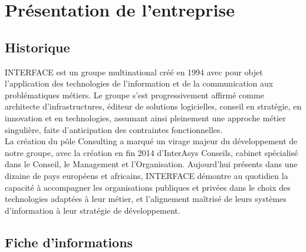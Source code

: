 \chapter{Présentation de l’entreprise}

\section{Historique}

INTERFACE est un groupe multinational créé en 1994 avec pour objet l’application des technologies de l’information et de la communication aux problématiques métiers. Le groupe s’est progressivement affirmé comme architecte d’infrastructures, éditeur de solutions logicielles, conseil en stratégie, en innovation et en technologies, assumant ainsi pleinement une approche métier singulière, faite d’anticipation des contraintes fonctionnelles. \\
La création du pôle Consulting a marqué un virage majeur du développement de notre groupe, avec la création en fin 2014 d’InterAsys Conseils, cabinet spécialisé dans le Conseil, le Management et l’Organisation. Aujourd’hui présents dans une dizaine de pays européens et africains, INTERFACE démontre au quotidien la capacité à accompagner les organisations publiques et privées dans le choix des technologies adaptées à leur métier, et l’alignement maîtrisé de leurs systèmes d’information à leur stratégie de développement.

\section{Fiche d'informations}

